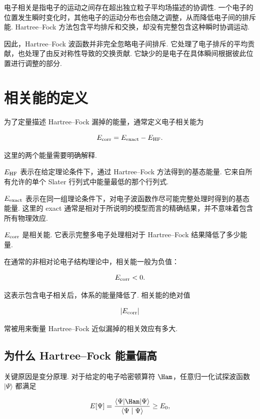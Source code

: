 \documentclass[UTF8,11pt,a4paper,openany]{ctexbook}
\newcommand{\ket}[1]{\lvert #1\rangle}\newcommand{\bra}[1]{\langle #1\rvert}
\newcommand{\braket}[2]{\langle #1\mid #2\rangle}\newcommand{\ii}{\mathrm i}
\begin{document}
\begin{definitionbox}
电子相关是指电子的运动之间存在超出独立粒子平均场描述的协调性. 一个电子的位置发生瞬时变化时，其他电子的运动分布也会随之调整，从而降低电子间的排斥能. Hartree--Fock 方法包含平均排斥和交换，却没有完整包含这种瞬时协调运动. 
\end{definitionbox}

因此，Hartree--Fock 波函数并非完全忽略电子间排斥. 它处理了电子排斥的平均贡献，也处理了由反对称性导致的交换贡献. 它缺少的是电子在具体瞬间根据彼此位置进行调整的部分. 

\section{相关能的定义}

为了定量描述 Hartree--Fock 漏掉的能量，通常定义电子相关能为

\[
E_{\rm corr}=E_{\rm exact}-E_{\rm HF}.
\]

这里的两个能量需要明确解释. 

\begin{notationbox}
$E_{\rm HF}$ 表示在给定理论条件下，通过 Hartree--Fock 方法得到的基态能量. 它来自所有允许的单个 Slater 行列式中能量最低的那个行列式. 

$E_{\rm exact}$ 表示在同一组理论条件下，对电子波函数作尽可能完整处理时得到的基态能量. 这里的 exact 通常是相对于所说明的模型而言的精确结果，并不意味着包含所有物理效应. 

$E_{\rm corr}$ 是相关能. 它表示完整多电子处理相对于 Hartree--Fock 结果降低了多少能量. 
\end{notationbox}

在通常的非相对论电子结构理论中，相关能一般为负值：

\[
E_{\rm corr}<0.
\]

这表示包含电子相关后，体系的能量降低了. 相关能的绝对值

\[
\lvert E_{\rm corr}\rvert
\]

常被用来衡量 Hartree--Fock 近似漏掉的相关效应有多大. 

\subsection{为什么 Hartree--Fock 能量偏高}

关键原因是变分原理. 对于给定的电子哈密顿算符 $\Ham$，任意归一化试探波函数 $\ket{\Psi}$ 都满足

\[
E[\Psi]
=
\frac{\bra{\Psi}\Ham\ket{\Psi}}
{\braket{\Psi}{\Psi}}
\geq E_0,
\]
\end{document}
